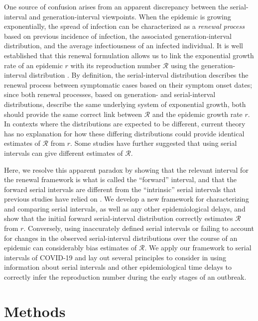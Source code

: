 \documentclass[12pt]{article}
\newcommand{\RR}{\ensuremath{{\mathcal R}}\xspace}
\begin{document}
One source of confusion arises from an apparent discrepancy between the serial-interval and generation-interval viewpoints.
When the epidemic is growing exponentially, the spread of infection can be characterized as a \emph{renewal process} based on previous incidence of infection, the associated generation-interval distribution, and the average infectiousness of an infected individual.
It is well established that this renewal formulation allows us to link the exponential growth rate of an epidemic $r$ with its reproduction number \RR using the generation-interval distribution \citep{wallinga2007generation}.
By definition, the serial-interval distribution describes the renewal process between symptomatic cases based on their symptom onset dates;
since both renewal processes, based on generation- and serial-interval distributions, describe the same underlying system of exponential growth, both should provide the same correct link between \RR and the epidemic growth rate $r$.
In contexts where the distributions are expected to be different, current theory has no explanation for how these differing distributions could provide identical estimates of \RR from $r$. 
Some studies have further suggested that using serial intervals can give different estimates of \RR \citep{britton2019estimation, ganyani2020estimating}.

Here, we resolve this apparent paradox by showing that the relevant interval for the renewal framework is what is called the ``forward'' interval, and that the forward serial intervals are different from the ``intrinsic'' serial intervals that previous studies have relied on \citep{svensson2007note,klinkenberg2011correlation,te2013estimating,champredon2018equivalence, britton2019estimation}.
We develop a new framework for characterizing and comparing serial intervals, as well as any other epidemiological delays, and show that the initial forward serial-interval distribution correctly estimates \RR from $r$.
Conversely, using inaccurately defined serial intervals or failing to account for changes in the observed serial-interval distributions over the course of an epidemic can considerably bias estimates of \RR.
We apply our framework to serial intervals of COVID-19 and lay out several principles to consider in using information about serial intervals and other epidemiological time delays to correctly infer the reproduction number during the early stages of an outbreak.

\section{Methods}
\end{document}
